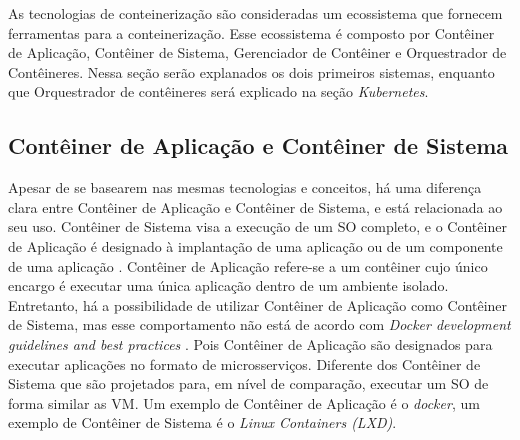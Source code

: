 As tecnologias de conteinerização são consideradas um ecossistema que fornecem ferramentas para a conteinerização. Esse ecossistema é composto por Contêiner de Aplicação, Contêiner de Sistema, Gerenciador de Contêiner e Orquestrador de Contêineres. Nessa seção serão explanados os dois primeiros sistemas, enquanto que Orquestrador de contêineres será explicado na seção \textit{Kubernetes}.

\subsection{Contêiner de Aplicação e Contêiner de Sistema}
Apesar de se basearem nas mesmas tecnologias e conceitos, há uma diferença clara entre Contêiner de Aplicação e Contêiner de Sistema, e está relacionada ao seu uso. Contêiner de Sistema visa a execução de um \ac{SO} completo, e o Contêiner de Aplicação é designado à implantação de uma aplicação ou de um componente de uma aplicação \newline {}. Contêiner de Aplicação refere-se a um contêiner cujo único encargo é executar uma única aplicação dentro de um ambiente isolado. Entretanto, há a possibilidade de utilizar Contêiner de Aplicação como Contêiner de Sistema, mas esse comportamento não está de acordo com \textit{Docker development guidelines and best practices} \cite{berg2016guidelines}. Pois Contêiner de Aplicação são designados para executar aplicações no formato de microsserviços. Diferente dos Contêiner de Sistema que são projetados para, em nível de comparação, executar um \ac{SO} de forma similar as \ac{VM}. Um exemplo de Contêiner de Aplicação é o \textit{docker}, um exemplo de Contêiner de Sistema é o \textit{Linux Containers (LXD)}.





